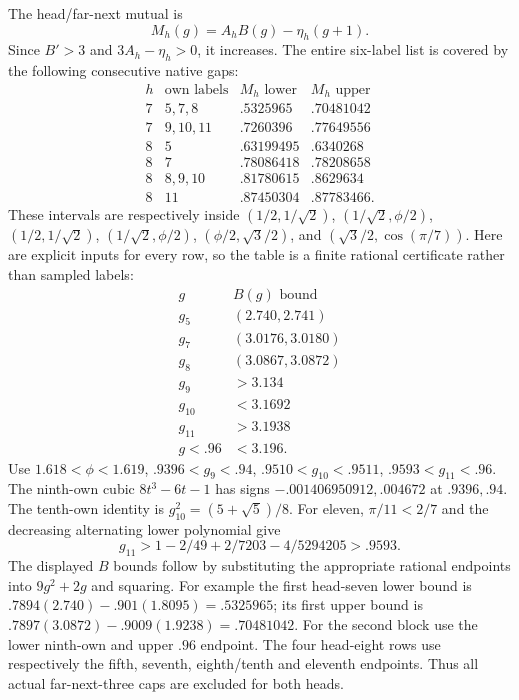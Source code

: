 The head/far-next mutual is
\[
               M_h(g)=A_h B(g)-\eta_h(g+1).
\]
Since \(B'>3\) and \(3A_h-\eta_h>0\), it increases.
The entire six-label list is covered by the following consecutive
native gaps:
\[
\begin{array}{c|c|c|c}
h&\text{own labels}&M_h\text{ lower}&M_h\text{ upper}\\ \hline
7&5,7,8&.5325965&.70481042\\
7&9,10,11&.7260396&.77649556\\
8&5&.63199495&.6340268\\
8&7&.78086418&.78208658\\
8&8,9,10&.81780615&.8629634\\
8&11&.87450304&.87783466 .
\end{array}
\]
These intervals are respectively inside
\((1/2,1/\sqrt2)\), \((1/\sqrt2,\phi/2)\),
\((1/2,1/\sqrt2)\), \((1/\sqrt2,\phi/2)\),
\((\phi/2,\sqrt3/2)\), and
\((\sqrt3/2,\cos(\pi/7))\).
Here are explicit inputs for every row, so the table is a finite
rational certificate rather than sampled labels:
\[
\begin{array}{c|c}
g&B(g)\text{ bound}\\ \hline
g_5&(2.740,2.741)\\
g_7&(3.0176,3.0180)\\
g_8&(3.0867,3.0872)\\
g_9&>3.134\\
g_{10}&<3.1692\\
g_{11}&>3.1938\\
g<.96&<3.196 .
\end{array}
\]
Use \(1.618<\phi<1.619\),
\(.9396<g_9<.94\), \(.9510<g_{10}<.9511\),
\(.9593<g_{11}<.96\).
The ninth-own cubic \(8t^3-6t-1\) has signs
\(-.001406950912,.004672\) at \(.9396,.94\).
The tenth-own identity is \(g_{10}^2=(5+\sqrt5)/8\).
For eleven,
\(\pi/11<2/7\) and the decreasing alternating lower polynomial give
\[
 g_{11}>1-2/49+2/7203-4/5294205>.9593.
\]
The displayed \(B\) bounds follow by substituting the appropriate
rational endpoints into \(9g^2+2g\) and squaring.
For example the first head-seven lower bound is
\(.7894(2.740)-.901(1.8095)=.5325965\);
its first upper bound is
\(.7897(3.0872)-.9009(1.9238)=.70481042\).
For the second block use the lower ninth-own and upper \(.96\)
endpoint.  The four head-eight rows use respectively
the fifth, seventh, eighth/tenth and eleventh endpoints.
Thus all actual far-next-three caps are excluded for both heads.

